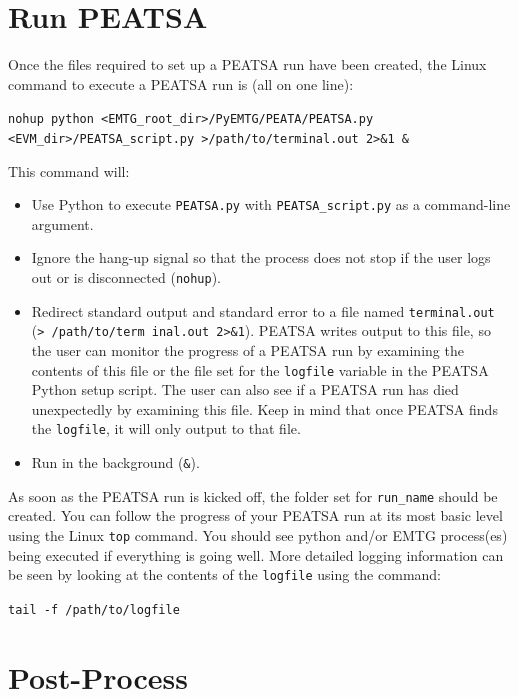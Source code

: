 \documentclass[11pt]{article}
\begin{document}
\section{Run PEATSA}
\label{sec:run_peatsa}

Once the files required to set up a \ac{PEATSA} run have been created, the Linux command to execute a \ac{PEATSA} run is (all on one line):

\texttt{nohup python <EMTG\_root\_dir>/PyEMTG/PEATA/PEATSA.py <EVM\_dir>/PEATSA\_script.py >\newline\indent /path/to/terminal.out 2>\&1 \&}

\noindent This command will:

\begin{itemize}
	\item Use Python to execute \texttt{PEATSA.py} with \texttt{PEATSA\_script.py} as a command-line argument.
	\item Ignore the hang-up signal so that the process does not stop if the user logs out or is disconnected (\texttt{nohup}).
	\item Redirect standard output and standard error to a file named \texttt{terminal.out} (\texttt{> /path/to/term inal.out 2>\&1}). \ac{PEATSA} writes output to this file, so the user can monitor the progress of a \ac{PEATSA} run by examining the contents of this file or the file set for the \texttt{logfile} variable in the \ac{PEATSA} Python setup script. The user can also see if a \ac{PEATSA} run has died unexpectedly by examining this file. Keep in mind that once \ac{PEATSA} finds the \texttt{logfile}, it will only output to that file.
	\item Run in the background (\texttt{\&}).
\end{itemize}
\noindent As soon as the \ac{PEATSA} run is kicked off, the folder set for \texttt{run\_name} should be created. You can follow the progress of your \ac{PEATSA} run at its most basic level using the Linux \texttt{top} command. You should see python and/or \ac{EMTG} process(es) being executed if everything is going well. More detailed logging information can be seen by looking at the contents of the \texttt{logfile} using the command:

\texttt{tail -f /path/to/logfile}


\section{Post-Process}
\label{sec:post_process}
\end{document}
